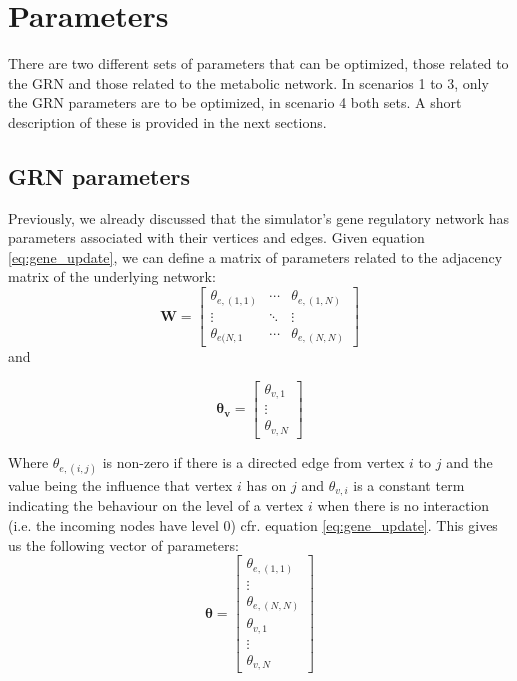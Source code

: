 \section{Parameters}\label{sec:params}
There are two different sets of parameters that can be optimized, those related to the GRN and those related to the metabolic network. In scenarios 1 to 3, only the GRN parameters are to be optimized, in scenario 4 
both sets. A short description of these is provided in the next sections.
\subsection{GRN parameters}
Previously, we already discussed that the simulator's gene regulatory network has parameters associated with their vertices and edges.
Given equation \ref{eq:gene_update}, we can define a matrix of parameters related to the adjacency matrix of the underlying network:
\begin{equation}
\mathbf{W} = \begin{bmatrix} 
\theta_{e,(1,1)} &\cdots & \theta_{e,(1,N)}\\
\vdots & \ddots & \vdots \\
\theta_{e(N,1} & \cdots & \theta_{e,(N,N)} 
      \end{bmatrix}
\end{equation}
and

\begin{equation}
 \boldsymbol{\theta_v} = \begin{bmatrix}
     \theta_{v,1} \\
      \vdots \\
      \theta_{v,N} 
     \end{bmatrix}
\end{equation}

Where $\theta_{e,(i,j)}$ is non-zero if there is a directed edge from vertex $i$ to $j$ and the value being the influence that vertex $i$ has on $j$ and $\theta_{v,i}$ is a constant term indicating the behaviour on the level of a vertex $i$ 
when there is no interaction (i.e. the incoming nodes have level 0) cfr. equation \ref{eq:gene_update}. This gives us the following vector of parameters:
\begin{equation}
 \mathbf{\theta} = \begin{bmatrix}
                     \theta_{e,(1,1)} \\
                     \vdots \\
                     \theta_{e,(N,N)} \\
                     \theta_{v,1} \\
                     \vdots \\
                     \theta_{v,N}
                    \end{bmatrix}
% 
\end{equation}
